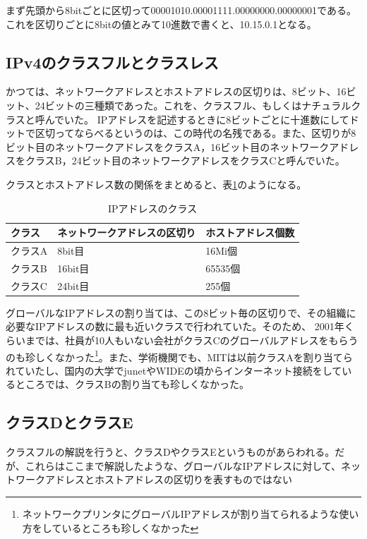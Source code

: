 まず先頭から8bitごとに区切って00001010.00001111.00000000.00000001である。これを区切りごとに8bitの値とみて10進数で書くと、10.15.0.1となる。

\subsection{IPv4のクラスフルとクラスレス}

かつては、ネットワークアドレスとホストアドレスの区切りは、8ビット、16ビット、24ビットの三種類であった。これを、クラスフル、もしくはナチュラルクラスと呼んでいた。 IPアドレスを記述するときに8ビットごとに十進数にしてドットで区切ってならべるというのは、この時代の名残である。また、区切りが8ビット目のネットワークアドレスをクラスA，16ビット目のネットワークアドレスをクラスB，24ビット目のネットワークアドレスをクラスCと呼んでいた。

クラスとホストアドレス数の関係をまとめると、表\ref{ipclass}のようになる。

\begin{table}[hbtp] \caption{IPアドレスのクラス} \label{ipclass}
\begin{center}
\begin{tabularx}{110mm}{XXX} \toprule
クラス & ネットワークアドレスの区切り & ホストアドレス個数\\ \midrule
クラスA & 8bit目 & 16Mi個\\
クラスB & 16bit目 & 65535個\\
クラスC & 24bit目 & 255個\\ \bottomrule
\end{tabularx}
\end{center}
\end{table}

グローバルなIPアドレスの割り当ては、この8ビット毎の区切りで、その組織に必要なIPアドレスの数に最も近いクラスで行われていた。そのため、 2001年くらいまでは、社員が10人もいない会社がクラスCのグローバルアドレスをもらうのも珍しくなかった\footnote{ネットワークプリンタにグローバルIPアドレスが割り当てられるような使い方をしているところも珍しくなかった}。また、学術機関でも、MITは以前クラスAを割り当てられていたし、国内の大学でjunetやWIDEの頃からインターネット接続をしているところでは、クラスBの割り当ても珍しくなかった。

\subsection{クラスDとクラスE}
クラスフルの解説を行うと、クラスDやクラスEというものがあらわれる。だが、これらはここまで解説したような、グローバルなIPアドレスに対して、ネットワークアドレスとホストアドレスの区切りを表すものではない


